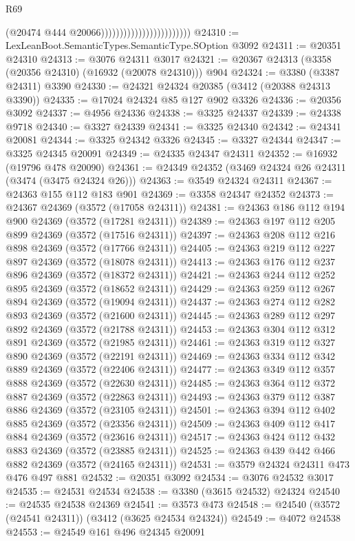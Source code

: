 \begin{lexlean}{R69}
\begin{coremodule}
                                                  (@20474 @444 @20066))))))))))))))))))))))))
@24310 := LexLeanBoot.SemanticTypes.SemanticType.SOption @3092
@24311 := @20351 @24310
@24313 := @3076 @24311 @3017
@24321 := @20367 @24313 (@3358 (@20356 @24310) (@16932 (@20078 @24310))) @904
@24324 := @3380 (@3387 @24311) @3390
@24330 := @24321 @24324 @20385 (@3412 (@20388 @24313 @3390))
@24335 := @17024 @24324 @85 @127 @902 @3326
@24336 := @20356 @3092
@24337 := @4956 @24336
@24338 := @3325 @24337
@24339 := @24338 @9718
@24340 := @3327 @24339
@24341 := @3325 @24340
@24342 := @24341 @20081
@24344 := @3325 @24342 @3326
@24345 := @3327 @24344
@24347 := @3325 @24345 @20091
@24349 := @24335 @24347 @24311
@24352 := @16932 (@19796 @478 @20090)
@24361 := @24349 @24352 (@3469 @24324 @26 @24311 (@3474 (@3475 @24324 @26)))
@24363 := @3549 @24324 @24311
@24367 := @24363 @155 @112 @183 @901
@24369 := @3358 @24347 @24352
@24373 := @24367 @24369 (@3572 (@17058 @24311))
@24381 := @24363 @186 @112 @194 @900 @24369 (@3572 (@17281 @24311))
@24389 := @24363 @197 @112 @205 @899 @24369 (@3572 (@17516 @24311))
@24397 := @24363 @208 @112 @216 @898 @24369 (@3572 (@17766 @24311))
@24405 := @24363 @219 @112 @227 @897 @24369 (@3572 (@18078 @24311))
@24413 := @24363 @176 @112 @237 @896 @24369 (@3572 (@18372 @24311))
@24421 := @24363 @244 @112 @252 @895 @24369 (@3572 (@18652 @24311))
@24429 := @24363 @259 @112 @267 @894 @24369 (@3572 (@19094 @24311))
@24437 := @24363 @274 @112 @282 @893 @24369 (@3572 (@21600 @24311))
@24445 := @24363 @289 @112 @297 @892 @24369 (@3572 (@21788 @24311))
@24453 := @24363 @304 @112 @312 @891 @24369 (@3572 (@21985 @24311))
@24461 := @24363 @319 @112 @327 @890 @24369 (@3572 (@22191 @24311))
@24469 := @24363 @334 @112 @342 @889 @24369 (@3572 (@22406 @24311))
@24477 := @24363 @349 @112 @357 @888 @24369 (@3572 (@22630 @24311))
@24485 := @24363 @364 @112 @372 @887 @24369 (@3572 (@22863 @24311))
@24493 := @24363 @379 @112 @387 @886 @24369 (@3572 (@23105 @24311))
@24501 := @24363 @394 @112 @402 @885 @24369 (@3572 (@23356 @24311))
@24509 := @24363 @409 @112 @417 @884 @24369 (@3572 (@23616 @24311))
@24517 := @24363 @424 @112 @432 @883 @24369 (@3572 (@23885 @24311))
@24525 := @24363 @439 @442 @466 @882 @24369 (@3572 (@24165 @24311))
@24531 := @3579 @24324 @24311 @473 @476 @497 @881
@24532 := @20351 @3092
@24534 := @3076 @24532 @3017
@24535 := @24531 @24534
@24538 := @3380 (@3615 @24532) @24324
@24540 := @24535 @24538 @24369
@24541 := @3573 @473
@24548 := @24540 (@3572 (@24541 @24311)) (@3412 (@3625 @24534 @24324))
@24549 := @4072 @24538
@24553 := @24549 @161 @496 @24345 @20091

\end{coremodule}
\end{lexlean}
